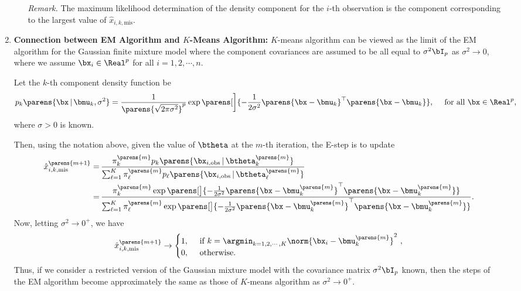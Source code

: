 \documentclass[12pt]{article}
\begin{document}
\begin{enumerate}[label=\textbf{\arabic*.}]
\begin{enumerate}
		\textit{Remark.} The maximum likelihood determination of the density component for the $i$-th observation is the component corresponding to the largest value of $\hat{x}_{i,k,\mathrm{mis}}$. 
		
	\end{enumerate}
	
	\item \textbf{Connection between EM Algorithm and $K$-Means Algorithm:} $K$-means algorithm can be viewed as the limit of the EM algorithm for the Gaussian finite mixture model where the component covariances are assumed to be all equal to $\sigma^2 \bI_p$ as $\sigma^2 \to 0$, where we assume $\bx_i \in \Real^p$ for all $i = 1, 2, \cdots, n$. 
	
	Let the $k$-th component density function be 
	\begin{align*}
		p_k \parens{\bx \,\vert\, \bmu_k, \sigma^2} = \frac{1}{\parens{\sqrt{2\pi \sigma^2}}^p } \exp \parens[\bigg]{- \frac{1}{2 \sigma^2} \parens{\bx - \bmu_k}^\top \parens{\bx - \bmu_k}}, \quad \text{ for all } \bx \in \Real^p, 
	\end{align*}
	where $\sigma > 0$ is known. 
	
	Then, using the notation above, given the value of $\btheta$ at the $m$-th iteration, the E-step is to update 
	\begin{align*}
		\hat{x}_{i,k,\mathrm{mis}}^{\parens{m+1}} = & \, \frac{\pi_k^{\parens{m}} p_k \parens{\bx_{i, \mathrm{obs}} \,\vert\, \btheta_k^{\parens{m}}}}{\sum_{\ell=1}^K \pi_{\ell}^{\parens{m}} p_{\ell} \parens{\bx_{i, \mathrm{obs}} \,\vert\, \btheta_{\ell}^{\parens{m}}}} \\ 
		= & \, \frac{\pi_k^{\parens{m}} \exp \parens[\big]{- \frac{1}{2 {\sigma}^2} \parens{\bx - \bmu_k^{\parens{m}}}^\top \parens{\bx - \bmu_k^{\parens{m}}}} }{\sum_{\ell=1}^K \pi_{\ell}^{\parens{m}} \exp \parens[\big]{- \frac{1}{2 {\sigma}^2} \parens{\bx - \bmu_k^{\parens{m}}}^\top \parens{\bx - \bmu_k^{\parens{m}}}} }. 
	\end{align*}
	Now, letting $\sigma^2 \to 0^+$, we have 
	\begin{align*}
		\hat{x}_{i,k,\mathrm{mis}}^{\parens{m+1}} \to 
		\begin{cases}
			1, & \, \text{ if $k = \argmin_{k = 1, 2, \cdots, K} \norm{\bx_i - \bmu_k^{\parens{m}}}^2$ }, \\ 
			0, & \, \text{ otherwise}. 
		\end{cases}
	\end{align*}
	Thus, if we consider a restricted version of the Gaussian mixture model with the covariance matrix $\sigma^2 \bI_p$ known, then the steps of the EM algorithm become approximately the same as those of $K$-means algorithm as $\sigma^2 \to 0^+$. 
	

\end{enumerate}
\end{document}
